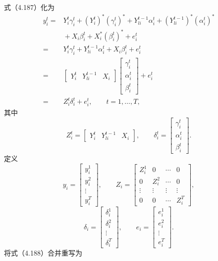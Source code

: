 式（4.187）化为
\begin{equation}
\begin{aligned}
y_i^t={}&Y_i^t\gamma_i^t+(Y_i^t)^*(\gamma_i^t)^*
 +Y_{li}^{t-1}\alpha_i^t+(Y_{li}^{t-1})^*(\alpha_i^t)^*\\
&{}+X_i\beta_i^t+X_i^*(\beta_i^t)^*+e_i^t\\
={}&Y_i^t\gamma_i^t+Y_{li}^{t-1}\alpha_i^t+X_i\beta_i^t+e_i^t\\
={}&\begin{bmatrix}Y_i^t&Y_{li}^{t-1}&X_i\end{bmatrix}
 \begin{bmatrix}\gamma_i^t\\\alpha_i^t\\\beta_i^t\end{bmatrix}+e_i^t\\
={}&Z_i^t\delta_i^t+e_i^t,\qquad t=1,\ldots,T,
\end{aligned}\tag{4.188}
\end{equation}
其中
\[
Z_i^t=\begin{bmatrix}Y_i^t&Y_{li}^{t-1}&X_i\end{bmatrix},
\qquad
\delta_i^t=\begin{bmatrix}\gamma_i^t\\\alpha_i^t\\\beta_i^t\end{bmatrix}.
\]
定义
\[
y_i=\begin{bmatrix}y_i^1\\y_i^2\\\vdots\\y_i^T\end{bmatrix},
\qquad
Z_i=\begin{bmatrix}
Z_i^1&0&\cdots&0\\
0&Z_i^2&\cdots&0\\
\vdots&\vdots&\vdots&\vdots\\
0&0&\cdots&Z_i^T
\end{bmatrix},
\]
\[
\delta_i=\begin{bmatrix}\delta_i^1\\\delta_i^2\\\vdots\\\delta_i^T\end{bmatrix},
\qquad
e_i=\begin{bmatrix}e_i^1\\e_i^2\\\vdots\\e_i^T\end{bmatrix}.
\]
将式（4.188）合并重写为
